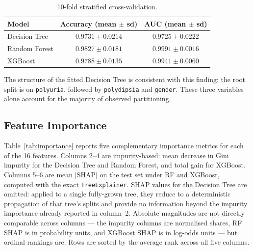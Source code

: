 \documentclass[11pt]{article}
\begin{document}
\begin{table}[H]
\centering
\small
\caption{10-fold stratified cross-validation.}
\label{tab:tree-cv}
\begin{tabular}{lcc}
\toprule
Model & Accuracy (mean $\pm$ sd) & AUC (mean $\pm$ sd) \\
\midrule
Decision Tree & $0.9731 \pm 0.0214$ & $0.9725 \pm 0.0222$ \\
Random Forest & $0.9827 \pm 0.0181$ & $0.9991 \pm 0.0016$ \\
XGBoost       & $0.9788 \pm 0.0135$ & $0.9941 \pm 0.0060$ \\
\bottomrule
\end{tabular}
\end{table}

The structure of the fitted Decision Tree is consistent with this finding:
the root split is on \texttt{polyuria}, followed by \texttt{polydipsia} and
\texttt{gender}. These three variables alone account for the majority of
observed partitioning.

\subsection*{Feature Importance}

Table~\ref{tab:importance} reports five complementary importance
metrics for each of the 16 features. Columns 2--4 are impurity-based:
mean decrease in Gini impurity for the Decision Tree and Random Forest,
and total gain for XGBoost. Columns 5--6 are mean $|\text{SHAP}|$ on
the test set under RF and XGBoost, computed with the exact
\texttt{TreeExplainer}. SHAP values for the Decision Tree are omitted:
applied to a single fully-grown tree, they reduce to a deterministic
propagation of that tree's splits and provide no information beyond
the impurity importance already reported in column~2. Absolute
magnitudes are not directly comparable across columns --- the impurity
columns are normalised shares, RF SHAP is in probability units, and
XGBoost SHAP is in log-odds units --- but ordinal rankings are. Rows
are sorted by the average rank across all five columns.
\end{document}

